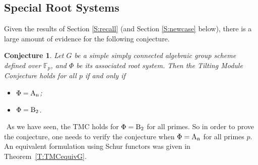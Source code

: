 \documentclass[twoside,11pt,reqno]{amsart}
\newcommand{\0}{\bar 0}
\newcommand{\1}{\bar 1}
\newtheorem{conj}{Conjecture}[subsection]
\theoremstyle{definition}
\numberwithin{equation}{subsection}
\begin{document}
\subsection{Special Root Systems} Given the results of Section \ref{S:recall} (and Section \ref{S:newcase} below), there is a large amount of evidence for the following conjecture. 
﻿
\begin{conj} Let $G$ be a simple simply connected algebraic group scheme defined over ${\mathbb F}_{p}$, and $\Phi$ be its associated root system. Then 
the Tilting Module Conjecture holds for all $p$ if and only if 
\begin{itemize} 
\item[(a)] $\Phi=\rm{A}_{n}$; 
\item[(b)] $\Phi=\rm{B}_{2}$. 
\end{itemize} 
\end{conj} 
﻿
As we have seen, the TMC holds for $\Phi=\rm{B}_{2}$ for all primes. So in order to prove the conjecture, one needs to verify the conjecture when $\Phi=\rm{A}_{n}$ for all primes $p$. 
An equivalent formulation using Schur functors was given in Theorem~\ref{T:TMCequivG}. 
﻿
\end{document}
